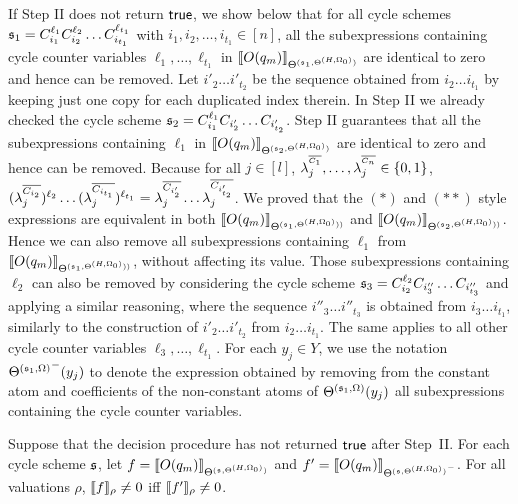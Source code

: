 If Step II does not return $\mathsf{true}$, we show below that for all cycle schemes ${\mathfrak{s} }_1=C_{i_1}^{\ell_1} C_{i_2}^{\ell_2} \dots C_{i_{t_1}}^{\ell_{t_1}}$ with $i_1,i_2,\dots,i_{t_1} \in [n]$, all the subexpressions containing cycle counter variables $\ell_1,\dots, \ell_{t_1}$ in $\llbracket O(q_{m})\rrbracket_{\Theta^{({\mathfrak{s} }_1, \Theta^{(H,\Omega_0)})}}$ are identical to zero and hence can be removed. Let ${i'_2} \dots {i'_{t_2}}$ be the sequence obtained from $i_2 \dots i_{t_1}$ by keeping just one copy for each duplicated index therein.  
In Step II we already checked the cycle scheme ${\mathfrak{s} }_2=C_{i_1}^{\ell_1} C_{i'_2} \dots C_{i'_{t_2}}$. Step II guarantees that all the subexpressions containing $\ell_1$ in 
$\llbracket O(q_{m})\rrbracket_{\Theta^{({\mathfrak{s} }_2, \Theta^{(H,\Omega_0)})}}$ are identical to zero and hence can be removed.
Because for all $j\in[l]$, $\lambda^{^{\overline{C_1}}}_j, \dots, \lambda^{^{\overline{C_n}}}_j \in \{0,1\}$,   $(\lambda^{\overline{C_{i_2}}}_{j})^{\ell_2} \dots (\lambda^{\overline{C_{i_{t_1}}}}_{j})^{\ell_{t_1}} = \lambda^{\overline{C_{i'_2}}}_{j} \dots \lambda^{\overline{C_{i'_{t_2}}}}_{j}$. We proved that the $(\ast)$ and $(\ast\ast)$ style expressions are equivalent in both $\llbracket O(q_{m})\rrbracket_{\Theta^{({\mathfrak{s} }_1, \Theta^{(H,\Omega_0)}))}}$ and $\llbracket O(q_{m})\rrbracket_{\Theta^{({\mathfrak{s} }_2, \Theta^{(H,\Omega_0)}))}}$.
Hence we can also remove all subexpressions containing $\ell_1$ from  $\llbracket O(q_{m})\rrbracket_{\Theta^{({\mathfrak{s} }_1, \Theta^{(H,\Omega_0)}))}}$, without affecting its value.
Those subexpressions containing $\ell_2$ can also be removed by considering the cycle scheme ${\mathfrak{s} }_3=C_{i_2}^{\ell_2} C_{i''_3} \dots C_{i''_{t_3}}$ and applying a similar reasoning, where the sequence ${i''_3} \dots {i''_{t_3}}$ is obtained from ${i_3} \dots  i_{t_1}$, similarly to the construction of ${i'_2} \dots {i'_{t_2}}$ from $i_2 \dots i_{t_1}$. The same applies to all other cycle counter variables $\ell_3,\dots,\ell_{t_1}$.
For each $y_j \in Y$, we use the notation ${\Theta^{({\mathfrak{s} }_1,\Omega)}}^-(y_j)$ to denote the expression obtained by removing from the constant atom and coefficients of the non-constant atoms of $\Theta^{({\mathfrak{s} }_1,\Omega)}(y_j)$ all subexpressions containing the cycle counter variables. 

\begin{lemma}\label{prop-bnd-domain-1}
	Suppose that the decision procedure has not returned $\mathsf{true}$ after Step~II. For each cycle scheme ${\mathfrak{s} }$, let $f=\llbracket O(q_{m})\rrbracket_{\Theta^{({\mathfrak{s} }, \Theta^{(H,\Omega_0)})}}$ and $f'=\llbracket O(q_{m})\rrbracket_{{\Theta^{({\mathfrak{s} }, \Theta^{(H,\Omega_0)})}}^-}$. For all valuations $\rho$, $\llbracket f\rrbracket_{\rho}\neq 0$ iff $\llbracket f'\rrbracket_{\rho} \neq 0$.
\end{lemma}



